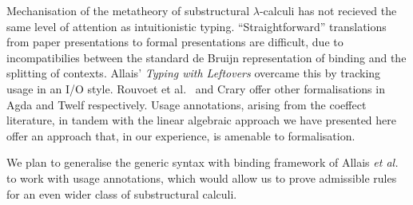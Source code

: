 \documentclass[submission,copyright,creativecommons]{eptcs}
\begin{document}
Mechanisation of the metatheory of substructural $\lambda$-calculi has
not recieved the same level of attention as intuitionistic
typing. ``Straightforward'' translations from paper presentations to
formal presentations are difficult, due to incompatibilies between the
standard de Bruijn representation of binding and the splitting of
contexts. Allais' \emph{Typing with Leftovers}
\cite{allais:LIPIcs:2018:10049} overcame this by tracking usage in an
I/O style. Rouvoet et al.~\cite{RPKV20} and Crary \cite{crary10} offer
other formalisations in Agda and Twelf respectively. Usage
annotations, arising from the coeffect literature, in tandem with the
linear algebraic approach we have presented here offer an approach
that, in our experience, is amenable to formalisation.

We plan to generalise the generic syntax with binding framework of
Allais \emph{et al.}~\cite{AACMM20} to work with usage annotations,
which would allow us to prove admissible rules for an even wider class
of substructural calculi.



\end{document}
